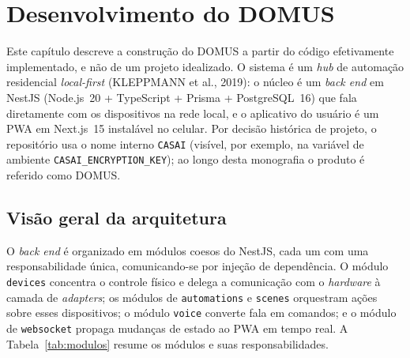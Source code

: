 \section{Desenvolvimento do DOMUS}\label{cap:desenvolvimento}

Este capítulo descreve a construção do DOMUS a partir do código efetivamente
implementado, e não de um projeto idealizado. O sistema é um \emph{hub} de
automação residencial \textit{local-first} (KLEPPMANN et al., 2019): o núcleo é
um \emph{back end} em NestJS (Node.js~20 + TypeScript + Prisma + PostgreSQL~16)
que fala diretamente com os dispositivos na rede local, e o aplicativo do
usuário é um PWA em Next.js~15 instalável no celular. Por decisão histórica de
projeto, o repositório usa o nome interno \texttt{CASAI} (visível, por exemplo,
na variável de ambiente \texttt{CASAI\_ENCRYPTION\_KEY}); ao longo desta
monografia o produto é referido como DOMUS.

\subsection{Visão geral da arquitetura}

O \emph{back end} é organizado em módulos coesos do NestJS, cada um com uma
responsabilidade única, comunicando-se por injeção de dependência. O módulo
\texttt{devices} concentra o controle físico e delega a comunicação com o
\emph{hardware} à camada de \emph{adapters}; os módulos de \texttt{automations}
e \texttt{scenes} orquestram ações sobre esses dispositivos; o módulo
\texttt{voice} converte fala em comandos; e o módulo de \texttt{websocket}
propaga mudanças de estado ao PWA em tempo real. A
Tabela~\ref{tab:modulos} resume os módulos e suas responsabilidades.

